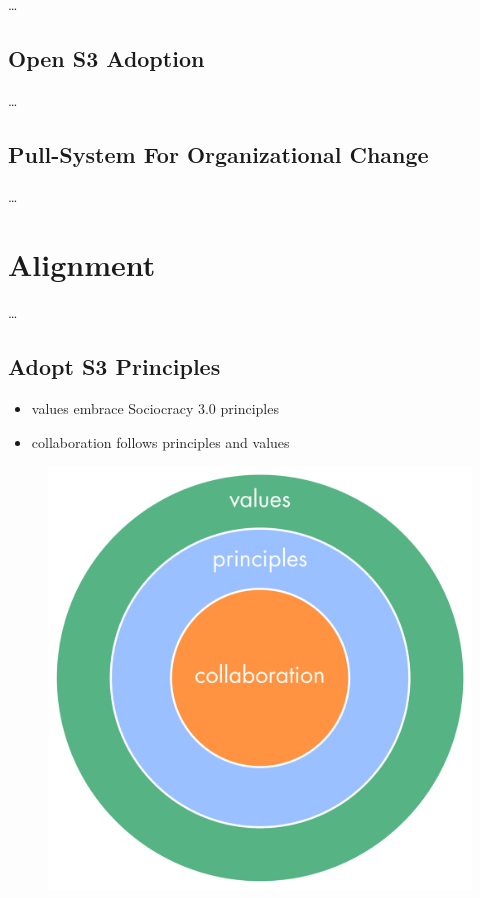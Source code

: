 {\ldots}

\section{Open S3 Adoption}
\label{opens3adoption}

{\ldots}

\section{Pull-System For Organizational Change}
\label{pull-systemfororganizationalchange}

{\ldots}

\chapter{Alignment}
\label{alignment}

{\ldots}

\section{Adopt S3 Principles}
\label{adopts3principles}

\begin{itemize}
\item values embrace Sociocracy 3.0 principles

\item collaboration follows principles and values

\end{itemize}

\begin{figure}[htbp]
\centering
\includegraphics[keepaspectratio,width=\textwidth,height=0.75\textheight]{img/collaboration-values/values-step3.png}
\end{figure}

